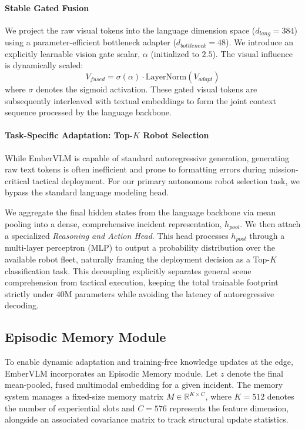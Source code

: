 \documentclass[runningheads]{llncs}
\begin{document}
\paragraph{Stable Gated Fusion}
We project the raw visual tokens into the language dimension space ($d_{lang} = 384$) using a parameter-efficient bottleneck adapter ($d_{bottleneck} = 48$). We introduce an explicitly learnable vision gate scalar, $\alpha$ (initialized to $2.5$). The visual influence is dynamically scaled:
\begin{equation}
    V_{fused} = \sigma(\alpha) \cdot \text{LayerNorm}(V_{adapt})
\end{equation}
where $\sigma$ denotes the sigmoid activation. These gated visual tokens are subsequently interleaved with textual embeddings to form the joint context sequence processed by the language backbone.

\paragraph{Task-Specific Adaptation: Top-$K$ Robot Selection}
While EmberVLM is capable of standard autoregressive generation, generating raw text tokens is often inefficient and prone to formatting errors during mission-critical tactical deployment. For our primary autonomous robot selection task, we bypass the standard language modeling head. 

We aggregate the final hidden states from the language backbone via mean pooling into a dense, comprehensive incident representation, $h_{pool}$. We then attach a specialized \textit{Reasoning and Action Head}. This head processes $h_{pool}$ through a multi-layer perceptron (MLP) to output a probability distribution over the available robot fleet, naturally framing the deployment decision as a Top-$K$ classification task. This decoupling explicitly separates general scene comprehension from tactical execution, keeping the total trainable footprint strictly under 40M parameters while avoiding the latency of autoregressive decoding.

\subsection{Episodic Memory Module}
\label{sec:memory}

To enable dynamic adaptation and training-free knowledge updates at the edge, EmberVLM incorporates an Episodic Memory module. Let $z$ denote the final mean-pooled, fused multimodal embedding for a given incident. The memory system manages a fixed-size memory matrix $M \in \mathbb{R}^{K \times C}$, where $K=512$ denotes the number of experiential slots and $C=576$ represents the feature dimension, alongside an associated covariance matrix to track structural update statistics.
\end{document}
